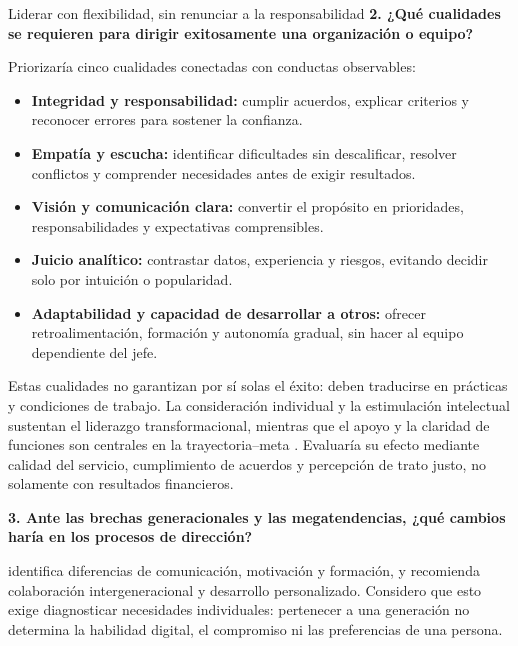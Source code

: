 \documentclass[11pt,letterpaper,oneside]{article}
\begin{document}
\begin{forobox}{Liderar con flexibilidad, sin renunciar a la responsabilidad}
\textbf{2. ¿Qué cualidades se requieren para dirigir exitosamente una organización o equipo?}

Priorizaría cinco cualidades conectadas con conductas observables:
\begin{itemize}
  \item \textbf{Integridad y responsabilidad:} cumplir acuerdos, explicar criterios y reconocer errores para sostener la confianza.
  \item \textbf{Empatía y escucha:} identificar dificultades sin descalificar, resolver conflictos y comprender necesidades antes de exigir resultados.
  \item \textbf{Visión y comunicación clara:} convertir el propósito en prioridades, responsabilidades y expectativas comprensibles.
  \item \textbf{Juicio analítico:} contrastar datos, experiencia y riesgos, evitando decidir solo por intuición o popularidad.
  \item \textbf{Adaptabilidad y capacidad de desarrollar a otros:} ofrecer retroalimentación, formación y autonomía gradual, sin hacer al equipo dependiente del jefe.
\end{itemize}
Estas cualidades no garantizan por sí solas el éxito: deben traducirse en prácticas y condiciones de trabajo. La consideración individual y la estimulación intelectual sustentan el liderazgo transformacional, mientras que el apoyo y la claridad de funciones son centrales en la trayectoria--meta \citep{openstaxContingencia2019,openstaxTransformacional2019}. Evaluaría su efecto mediante calidad del servicio, cumplimiento de acuerdos y percepción de trato justo, no solamente con resultados financieros.

\textbf{3. Ante las brechas generacionales y las megatendencias, ¿qué cambios haría en los procesos de dirección?}

\citet{sanchezRaona2023} identifica diferencias de comunicación, motivación y formación, y recomienda colaboración intergeneracional y desarrollo personalizado. Considero que esto exige diagnosticar necesidades individuales: pertenecer a una generación no determina la habilidad digital, el compromiso ni las preferencias de una persona.


\end{forobox}
\end{document}
